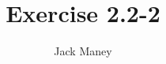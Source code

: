 \documentclass{article}
\begin{document}
\title{Exercise 2.2-2}
\author{Jack Maney}
\maketitle
\end{document}
